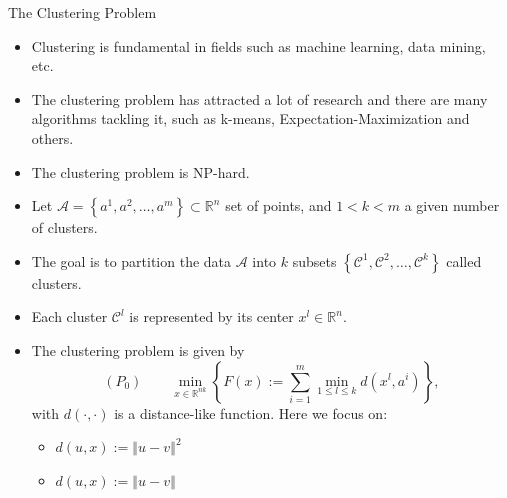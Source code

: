 \documentclass[9pt]{beamer}
\newcommand{\R}{\mathbb{R}} %
\newcommand{\norm}[1]{\left\Vert {#1} \right\Vert} %
\begin{document}
\begin{frame}{The Clustering Problem}
    	\begin{itemize}[<+->]
    		\item Clustering is fundamental in fields such as machine learning, data mining, etc.
    		\item The clustering problem has attracted a lot of research and there are many algorithms tackling it, such as k-means, Expectation-Maximization and others.
    		\item The clustering problem is NP-hard.
    		\item Let $\mathcal{A}=\left\{ a^1, a^2, \ldots, a^m \right\} \subset \R^n$ set of points, and $1<k<m$ a given number of clusters.
    		\item The goal is to partition the data $\mathcal{A}$ into $k$ subsets $\left\{ \mathcal{C}^1, \mathcal{C}^2, \ldots, \mathcal{C}^k \right\}$ called clusters.
    		\item Each cluster $\mathcal{C}^l$ is represented by its center $x^l \in \R^n$.
    	
    		\item The clustering problem is given by
    			\begin{equation*}
    				(P_0) \qquad \min\limits_{x \in \R^{nk}} \left\{ F(x) := \sum\limits_{i=1}^{m} \min\limits_{1 \le l \le k} d(x^l,a^i) \right\} ,
				\end{equation*}
				with $\textit{d}(\cdot ,\cdot)$ is a distance-like function.
				Here we focus on:
				\begin{itemize}[<+->]
					\item $d(u,x) := \norm{u-v}^2$
					\item $d(u,x) := \norm{u-v}$
				\end{itemize}
		\end{itemize}
		
    \end{frame}
    
\end{document}
